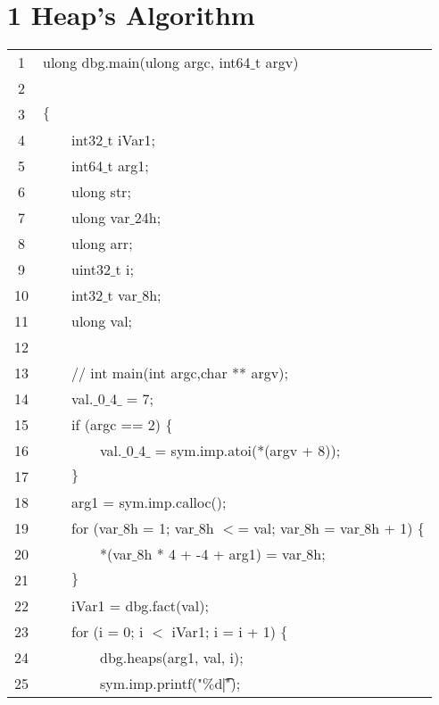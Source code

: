 \documentclass{report}
\newcommand{\tab}{$\quad$}
\newcommand{\csfont}[1]{\fontfamily{cmtt}\selectfont #1}
\begin{document}
\section*{1 Heap's Algorithm}
  \begin{tabular}{c|l}
    \hline
    1 & {\csfont{ulong dbg.main(ulong argc, int64$\_$t argv)}} \\
    2 & {\csfont{}} \\
    3 & {\csfont{$\{$}} \\
    4 & {\csfont{\tab \tab int32$\_$t iVar1;}} \\
    5 & {\csfont{\tab \tab int64$\_$t arg1;}} \\
    6 & {\csfont{\tab \tab ulong str;}} \\
    7 & {\csfont{\tab \tab ulong var$\_$24h;}} \\
    8 & {\csfont{\tab \tab ulong arr;}} \\
    9 & {\csfont{\tab \tab uint32$\_$t i;}} \\
    10 & {\csfont{\tab \tab int32$\_$t var$\_$8h;}} \\
    11 & {\csfont{\tab \tab ulong val;}} \\
    12 & {\csfont{\tab \tab }} \\
    13 & {\csfont{\tab \tab // int main(int argc,char ** argv);}} \\
    14 & {\csfont{\tab \tab val.$\_$0$\_$4$\_$ = 7;}} \\
    15 & {\csfont{\tab \tab if (argc == 2) $\{$}} \\
    16 & {\csfont{\tab \tab \tab \tab val.$\_$0$\_$4$\_$ = sym.imp.atoi(*(argv + 8));}} \\
    17 & {\csfont{\tab \tab $\}$}} \\
    18 & {\csfont{\tab \tab arg1 = sym.imp.calloc();}} \\
    19 & {\csfont{\tab \tab for (var$\_$8h = 1; var$\_$8h $<$= val; var$\_$8h = var$\_$8h + 1) $\{$}} \\
    20 & {\csfont{\tab \tab \tab \tab *(var$\_$8h * 4 + -4 + arg1) = var$\_$8h;}} \\
    21 & {\csfont{\tab \tab $\}$}} \\
    22 & {\csfont{\tab \tab iVar1 = dbg.fact(val);}} \\
    23 & {\csfont{\tab \tab for (i = 0; i $<$ iVar1; i = i + 1) $\{$}} \\
    24 & {\csfont{\tab \tab \tab \tab dbg.heaps(arg1, val, i);}} \\
    25 & {\csfont{\tab \tab \tab \tab sym.imp.printf("$\%$d\t|");}} \\

\end{tabular}
\end{document}
